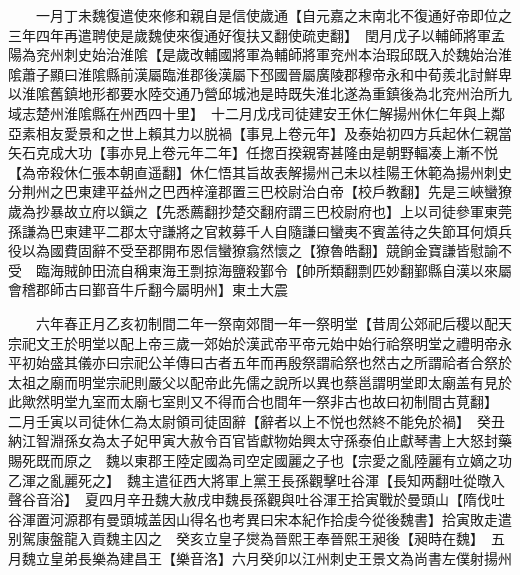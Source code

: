 　　一月丁未魏復遣使來修和親自是信使歲通【自元嘉之末南北不復通好帝即位之三年四年再遣聘使是歲魏使來復通好復扶又翻使疏吏翻】　閏月戊子以輔師將軍孟陽為兖州刺史始治淮隂【是歲改輔國將軍為輔師將軍兖州本治瑕邱既入於魏始治淮隂蕭子顯曰淮隂縣前漢屬臨淮郡後漢屬下邳國晉屬廣陵郡穆帝永和中荀羨北討鮮卑以淮隂舊鎮地形都要水陸交通乃營邱城池是時既失淮北遂為重鎮後為北兖州治所九域志楚州淮隂縣在州西四十里】　十二月戊戌司徒建安王休仁解揚州休仁年與上鄰亞素相友愛景和之世上賴其力以脱禍【事見上卷元年】及泰始初四方兵起休仁親當矢石克成大功【事亦見上卷元年二年】任揔百揆親寄甚隆由是朝野輻凑上漸不悦【為帝殺休仁張本朝直遥翻】休仁悟其旨故表解揚州己未以桂陽王休範為揚州刺史　分荆州之巴東建平益州之巴西梓潼郡置三巴校尉治白帝【校戶教翻】先是三峽蠻獠歲為抄暴故立府以鎭之【先悉薦翻抄楚交翻府謂三巴校尉府也】上以司徒參軍東莞孫謙為巴東建平二郡太守謙將之官敕募千人自隨謙曰蠻夷不賓盖待之失節耳何煩兵役以為國費固辭不受至郡開布恩信蠻獠翕然懷之【獠魯皓翻】競餉金寶謙皆慰諭不受　臨海賊帥田流自稱東海王剽掠海鹽殺鄞令【帥所類翻剽匹妙翻鄞縣自漢以來屬會稽郡師古曰鄞音牛斤翻今屬明州】東土大震

　　六年春正月乙亥初制間二年一祭南郊間一年一祭明堂【昔周公郊祀后稷以配天宗祀文王於明堂以配上帝三歲一郊始於漢武帝平帝元始中始行祫祭明堂之禮明帝永平初始盛其儀亦曰宗祀公羊傳曰古者五年而再殷祭謂祫祭也然古之所謂祫者合祭於太祖之廟而明堂宗祀則嚴父以配帝此先儒之說所以異也蔡邕謂明堂即太廟盖有見於此歟然明堂九室而太廟七室則又不得而合也間年一祭非古也故曰初制間古莧翻】　二月壬寅以司徒休仁為太尉領司徒固辭【辭者以上不悦也然終不能免於禍】　癸丑納江智淵孫女為太子妃甲寅大赦令百官皆獻物始興太守孫泰伯止獻琴書上大怒封藥賜死既而原之　魏以東郡王陸定國為司空定國麗之子也【宗愛之亂陸麗有立嫡之功乙渾之亂麗死之】　魏主遣征西大將軍上黨王長孫觀擊吐谷渾【長知两翻吐從暾入聲谷音浴】　夏四月辛丑魏大赦戌申魏長孫觀與吐谷渾王拾寅戰於曼頭山【隋伐吐谷渾置河源郡有曼頭城盖因山得名也考異曰宋本紀作拾虔今從後魏書】拾寅敗走遣别駕康盤龍入貢魏主囚之　癸亥立皇子爕為晉熙王奉晉熙王昶後【昶時在魏】　五月魏立皇弟長樂為建昌王【樂音洛】六月癸卯以江州刺史王景文為尚書左僕射揚州

